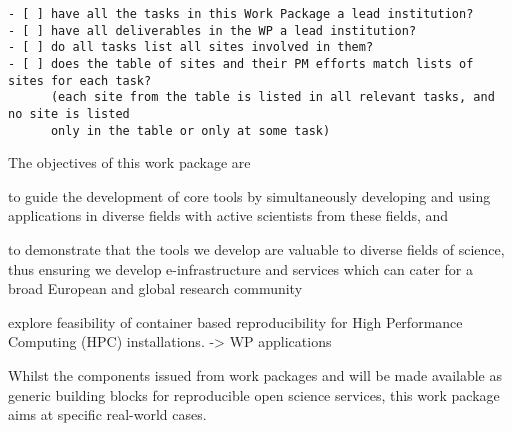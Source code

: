 \begin{draft}
\begin{verbatim}
- [ ] have all the tasks in this Work Package a lead institution?
- [ ] have all deliverables in the WP a lead institution?
- [ ] do all tasks list all sites involved in them?
- [ ] does the table of sites and their PM efforts match lists of sites for each task?
      (each site from the table is listed in all relevant tasks, and no site is listed
      only in the table or only at some task)
\end{verbatim}
\end{draft}

\begin{workpackage}[
  id=applications,
  wphases=0-36,
  swsites,
  title=Applications and use cases,
  short=Applications,
  lead=MP,
  SRLRM=9,
]


\begin{wpobjectives}
  The objectives of this work package are
 \begin{compactitem}
   \item to guide the development of core tools by simultaneously
     developing and using applications in diverse fields with active
     scientists from these fields, and
   \item to demonstrate that the tools we develop are valuable to diverse
     fields of science, thus ensuring we develop e-infrastructure and
     services which can cater for a broad European and global research community
   \item explore feasibility of container based reproducibility for High
     Performance Computing (HPC) installations. -> WP applications
     
   \end{compactitem}
\end{wpobjectives}

\begin{wpdescription}

  Whilst the components issued from work packages   and  will be
  made available as generic building blocks for reproducible open science services,
  this work package aims at specific real-world cases.


\end{wpdescription}
\end{workpackage}
